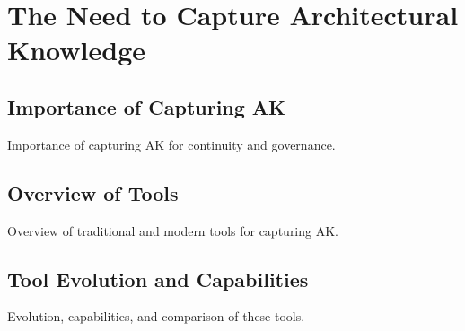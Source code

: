 \chapter{The Need to Capture Architectural Knowledge}
    \section{Importance of Capturing AK}
        Importance of capturing AK for continuity and governance.
    \section{Overview of Tools}
        Overview of traditional and modern tools for capturing AK.
    \section{Tool Evolution and Capabilities}
        Evolution, capabilities, and comparison of these tools.